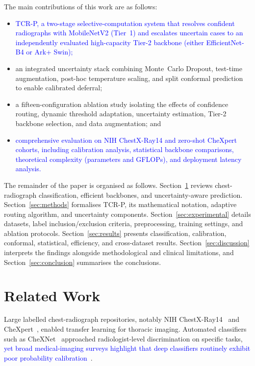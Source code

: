\documentclass[diagnostics,article,submit,moreauthors]{Definitions/mdpi}
\newcommand{\rev}[1]{\textcolor{blue}{#1}}
\begin{document}
The main contributions of this work are as follows:
\begin{itemize}
\item \rev{TCR-P, a two-stage selective-computation system that resolves confident radiographs with MobileNetV2 (Tier~1) and escalates uncertain cases to an independently evaluated high-capacity Tier-2 backbone (either EfficientNet-B4 or Ark+ Swin);}
\item an integrated uncertainty stack combining Monte~Carlo Dropout, test-time augmentation, post-hoc temperature scaling, and split conformal prediction to enable calibrated deferral;
\item a fifteen-configuration ablation study isolating the effects of confidence routing, dynamic threshold adaptation, uncertainty estimation, Tier-2 backbone selection, and data augmentation; and
\item \rev{comprehensive evaluation on NIH ChestX-Ray14 and zero-shot CheXpert cohorts, including calibration analysis, statistical backbone comparisons, theoretical complexity (parameters and GFLOPs), and deployment latency analysis.}
\end{itemize}

The remainder of the paper is organised as follows. Section~\ref{sec:related} reviews chest-radiograph classification, efficient backbones, and uncertainty-aware prediction. Section~\ref{sec:methods} formalises TCR-P, its mathematical notation, adaptive routing algorithm, and uncertainty components. Section~\ref{sec:experimental} details datasets, label inclusion/exclusion criteria, preprocessing, training settings, and ablation protocols. Section~\ref{sec:results} presents classification, calibration, conformal, statistical, efficiency, and cross-dataset results. Section~\ref{sec:discussion} interprets the findings alongside methodological and clinical limitations, and Section~\ref{sec:conclusion} summarises the conclusions.

\section{Related Work}
\label{sec:related}

Large labelled chest-radiograph repositories, notably NIH ChestX-Ray14~\cite{wang2017chestxray} and CheXpert~\cite{irvin2019chexpert}, enabled transfer learning for thoracic imaging. Automated classifiers such as CheXNet~\cite{rajpurkar2018chexnext} approached radiologist-level discrimination on specific tasks, \rev{yet broad medical-imaging surveys highlight that deep classifiers routinely exhibit poor probability calibration}~\cite{litjens2017survey}.
\end{document}
